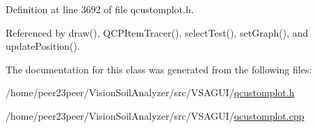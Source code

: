 Definition at line 3692 of file qcustomplot.\+h.



Referenced by draw(), Q\+C\+P\+Item\+Tracer(), select\+Test(), set\+Graph(), and update\+Position().



The documentation for this class was generated from the following files\+:\begin{DoxyCompactItemize}
\item 
/home/peer23peer/\+Vision\+Soil\+Analyzer/src/\+V\+S\+A\+G\+U\+I/\hyperlink{qcustomplot_8h}{qcustomplot.\+h}\item 
/home/peer23peer/\+Vision\+Soil\+Analyzer/src/\+V\+S\+A\+G\+U\+I/\hyperlink{qcustomplot_8cpp}{qcustomplot.\+cpp}\end{DoxyCompactItemize}

